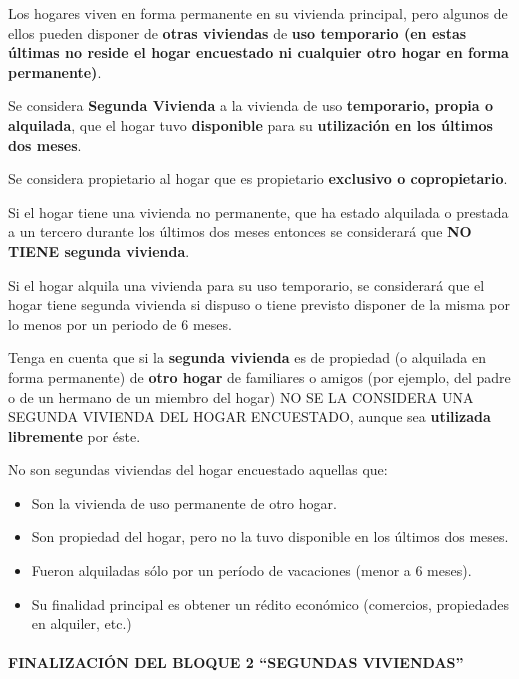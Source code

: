 \documentclass[
  openany]{book}
\begin{document}
Los hogares viven en forma permanente en su vivienda principal, pero algunos de ellos pueden disponer de \textbf{otras viviendas} de \textbf{uso temporario (en estas últimas no reside el hogar encuestado ni cualquier otro hogar en forma permanente)}.

Se considera \textbf{Segunda Vivienda} a la vivienda de uso \textbf{temporario, propia o alquilada}, que el hogar tuvo \textbf{disponible} para su \textbf{utilización en los últimos dos meses}.

Se considera propietario al hogar que es propietario \textbf{exclusivo o copropietario}.

Si el hogar tiene una vivienda no permanente, que ha estado alquilada o prestada a un tercero durante los últimos dos meses entonces se considerará que \textbf{NO TIENE segunda vivienda}.

Si el hogar alquila una vivienda para su uso temporario, se considerará que el hogar tiene segunda vivienda si dispuso o tiene previsto disponer de la misma por lo menos por un periodo de 6 meses.

Tenga en cuenta que si la \textbf{segunda vivienda} es de propiedad (o alquilada en forma permanente) de \textbf{otro hogar} de familiares o amigos (por ejemplo, del padre o de un hermano de un miembro del hogar) NO SE LA CONSIDERA UNA SEGUNDA VIVIENDA DEL HOGAR ENCUESTADO, aunque sea \textbf{utilizada libremente} por éste.

No son segundas viviendas del hogar encuestado aquellas que:

\begin{itemize}
\item
  Son la vivienda de uso permanente de otro hogar.
\item
  Son propiedad del hogar, pero no la tuvo disponible en los últimos dos meses.
\item
  Fueron alquiladas sólo por un período de vacaciones (menor a 6 meses).
\item
  Su finalidad principal es obtener un rédito económico (comercios, propiedades en alquiler, etc.)
\end{itemize}

\hypertarget{finalizacion-del-bloque-2-segundas-viviendas}{%
\paragraph{\texorpdfstring{\textbf{FINALIZACIÓN DEL BLOQUE 2 ``SEGUNDAS VIVIENDAS''}}{FINALIZACIÓN DEL BLOQUE 2 ``SEGUNDAS VIVIENDAS''}}\label{finalizacion-del-bloque-2-segundas-viviendas}}
\end{document}
